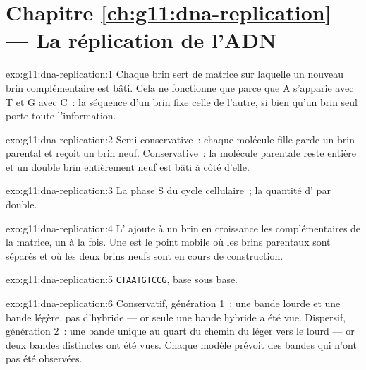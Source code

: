 \section*{Chapitre \ref{ch:g11:dna-replication} --- La réplication de l'ADN}

\begin{solution}{exo:g11:dna-replication:1}
Chaque brin sert de matrice sur laquelle un nouveau brin complémentaire
est bâti. Cela ne fonctionne que parce que A s'apparie avec T et G avec
C~: la séquence d'un brin fixe celle de l'autre, si bien qu'un brin
seul porte toute l'information.
\end{solution}

\begin{solution}{exo:g11:dna-replication:2}
Semi-conservative~: chaque molécule fille garde un brin parental et
reçoit un brin neuf. Conservative~: la molécule parentale reste entière
et un double brin entièrement neuf est bâti à côté d'elle.
\end{solution}

\begin{solution}{exo:g11:dna-replication:3}
La phase S du cycle cellulaire~; la quantité d' par  double.
\end{solution}

\begin{solution}{exo:g11:dna-replication:4}
L' ajoute à un brin en croissance les 
complémentaires de la matrice, un à la fois. Une 
est le point mobile où les brins parentaux sont séparés et où les deux
brins neufs sont en cours de construction.
\end{solution}

\begin{solution}{exo:g11:dna-replication:5}
\texttt{CTAATGTCCG}, base sous base.
\end{solution}

\begin{solution}{exo:g11:dna-replication:6}
Conservatif, génération 1~: une bande lourde et une bande légère, pas
d'hybride --- or seule une bande hybride a été vue. Dispersif,
génération 2~: une bande unique au quart du chemin du léger vers le
lourd --- or deux bandes distinctes ont été vues. Chaque modèle prévoit
des bandes qui n'ont pas été observées.
\end{solution}

